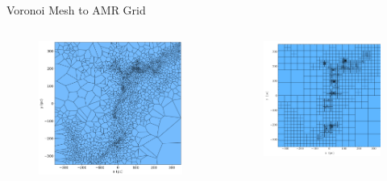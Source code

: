 \documentclass[aspectratio=169]{beamer}
\begin{document}
\begin{frame}{Voronoi Mesh to AMR Grid} %
    \begin{columns}
        \begin{column}{0.45\textwidth}
            \begin{figure}[h!]
                \centering
                \includegraphics[width=\linewidth]{../images/voronoi_mesh.png}
                \label{fig:voronoi_example}
            \end{figure}
        \end{column}
        \begin{column}{0.44\textwidth}
            \begin{figure}[h!]
                \centering
                \includegraphics[width=\linewidth]{../images/amr_grid_from_voronoi.png}

\end{figure}
\end{column}
\end{columns}
\end{frame}
\end{document}
